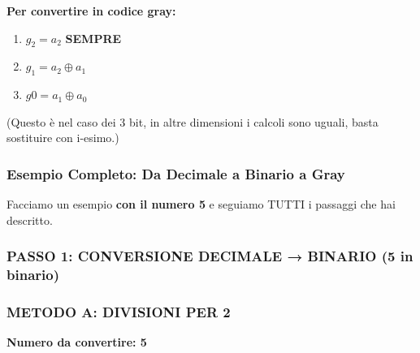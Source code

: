 \documentclass[
]{article}
\providecommand{\tightlist}{%
  \setlength{\itemsep}{0pt}\setlength{\parskip}{0pt}}
\begin{document}
\textbf{Per convertire in codice gray:}

\begin{enumerate}
\def\labelenumi{\arabic{enumi}.}
\tightlist
\item
  \(g_2 = a_2\) \textbf{SEMPRE}
\item
  \(g_1 = a_2 \oplus a_1\)
\item
  \(g0 = a_1 \oplus a_0\)
\end{enumerate}

(Questo è nel caso dei 3 bit, in altre dimensioni i calcoli sono uguali, basta sostituire con i-esimo.)

\hypertarget{esempio-completo-da-decimale-a-binario-a-gray}{%
\subsubsection{Esempio Completo: Da Decimale a Binario a Gray}\label{esempio-completo-da-decimale-a-binario-a-gray}}

Facciamo un esempio \textbf{con il numero 5} e seguiamo TUTTI i passaggi che hai descritto.

\hypertarget{passo-1-conversione-decimale-binario-5-in-binario}{%
\subsubsection{\texorpdfstring{\textbf{PASSO 1: CONVERSIONE DECIMALE → BINARIO (5 in binario)}}{PASSO 1: CONVERSIONE DECIMALE → BINARIO (5 in binario)}}\label{passo-1-conversione-decimale-binario-5-in-binario}}

\hypertarget{metodo-a-divisioni-per-2}{%
\subsubsection{\texorpdfstring{\textbf{METODO A: DIVISIONI PER 2}}{METODO A: DIVISIONI PER 2}}\label{metodo-a-divisioni-per-2}}

\textbf{Numero da convertire: 5}
\end{document}
